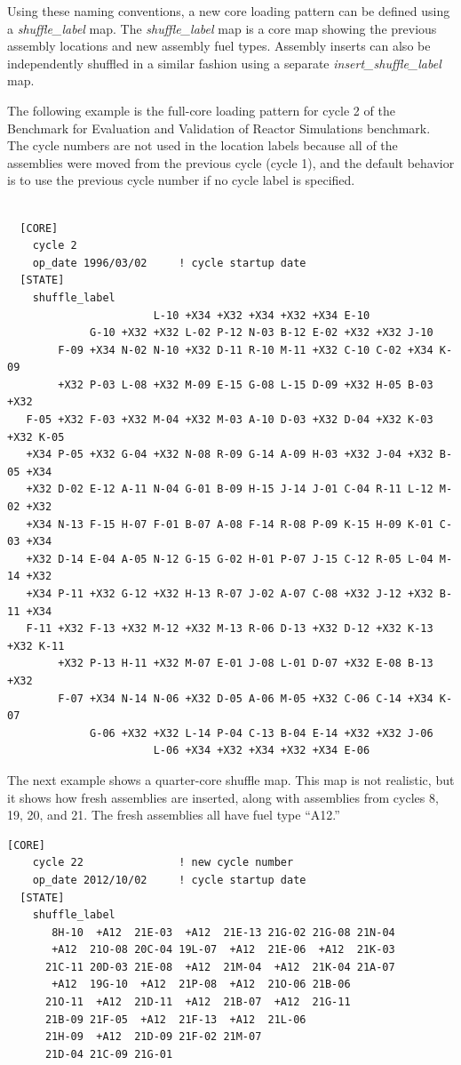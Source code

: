 Using these naming conventions, a new core loading pattern can be defined using a {\it shuffle\_label} map.
The {\it shuffle\_label} map is a core map showing the previous assembly locations and
new assembly fuel types. Assembly inserts  can also be independently shuffled in a similar
fashion using a separate {\it insert\_shuffle\_label} map.

The following example is the full-core loading pattern for cycle 2 of the Benchmark for Evaluation and
Validation of Reactor Simulations benchmark.
The cycle numbers are not used in the location labels because all of the assemblies
were moved from the previous cycle (cycle 1), and the default behavior is to use
the previous cycle number if no cycle label is specified.
\begin{Verbatim}[fontsize=\small]

  [CORE]
    cycle 2
    op_date 1996/03/02     ! cycle startup date
  [STATE]
    shuffle_label
                       L-10 +X34 +X32 +X34 +X32 +X34 E-10
             G-10 +X32 +X32 L-02 P-12 N-03 B-12 E-02 +X32 +X32 J-10
        F-09 +X34 N-02 N-10 +X32 D-11 R-10 M-11 +X32 C-10 C-02 +X34 K-09
        +X32 P-03 L-08 +X32 M-09 E-15 G-08 L-15 D-09 +X32 H-05 B-03 +X32
   F-05 +X32 F-03 +X32 M-04 +X32 M-03 A-10 D-03 +X32 D-04 +X32 K-03 +X32 K-05
   +X34 P-05 +X32 G-04 +X32 N-08 R-09 G-14 A-09 H-03 +X32 J-04 +X32 B-05 +X34
   +X32 D-02 E-12 A-11 N-04 G-01 B-09 H-15 J-14 J-01 C-04 R-11 L-12 M-02 +X32
   +X34 N-13 F-15 H-07 F-01 B-07 A-08 F-14 R-08 P-09 K-15 H-09 K-01 C-03 +X34
   +X32 D-14 E-04 A-05 N-12 G-15 G-02 H-01 P-07 J-15 C-12 R-05 L-04 M-14 +X32
   +X34 P-11 +X32 G-12 +X32 H-13 R-07 J-02 A-07 C-08 +X32 J-12 +X32 B-11 +X34
   F-11 +X32 F-13 +X32 M-12 +X32 M-13 R-06 D-13 +X32 D-12 +X32 K-13 +X32 K-11
        +X32 P-13 H-11 +X32 M-07 E-01 J-08 L-01 D-07 +X32 E-08 B-13 +X32
        F-07 +X34 N-14 N-06 +X32 D-05 A-06 M-05 +X32 C-06 C-14 +X34 K-07
             G-06 +X32 +X32 L-14 P-04 C-13 B-04 E-14 +X32 +X32 J-06
                       L-06 +X34 +X32 +X34 +X32 +X34 E-06

\end{Verbatim}

The next example shows a quarter-core shuffle map. This map is not realistic,
but it shows how fresh assemblies are inserted, along with assemblies from
cycles 8, 19, 20, and 21. The fresh assemblies all have fuel type ``A12.''
\vfill
\begin{Verbatim}[fontsize=\small]
  [CORE]
    cycle 22               ! new cycle number
    op_date 2012/10/02     ! cycle startup date
  [STATE]
    shuffle_label
       8H-10  +A12  21E-03  +A12  21E-13 21G-02 21G-08 21N-04
       +A12  21O-08 20C-04 19L-07  +A12  21E-06  +A12  21K-03
      21C-11 20D-03 21E-08  +A12  21M-04  +A12  21K-04 21A-07
       +A12  19G-10  +A12  21P-08  +A12  21O-06 21B-06
      21O-11  +A12  21D-11  +A12  21B-07  +A12  21G-11
      21B-09 21F-05  +A12  21F-13  +A12  21L-06
      21H-09  +A12  21D-09 21F-02 21M-07
      21D-04 21C-09 21G-01

\end{Verbatim}


